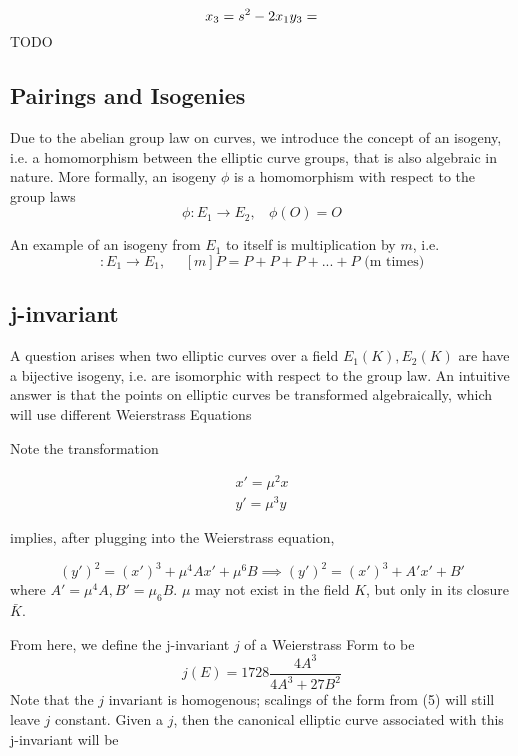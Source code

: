 \documentclass[12pt,twoside]{article}
\begin{document}
\begin{equation}
x_{3} = s^{2} - 2x_{1} \\
y_{3} = 
\end{equation} 
TODO




\subsection{Pairings and Isogenies} 
Due to the abelian group law on curves, we introduce the concept of an isogeny, i.e. a homomorphism between the elliptic curve groups, that is also algebraic in nature. More formally, an isogeny $\phi$ is a homomorphism with respect to the group laws
$$ \phi: E_{1} \rightarrow E_{2}, \> \> \> \> \phi(O) = O $$

An example of an isogeny from $E_{1}$ to itself is multiplication by $m$, i.e. 
\begin{equation} 
[m]: E_{1} \rightarrow E_{1}, \> \> \> \> \> \> [m]P = P+P+P+...+P \textrm{  (m times)}
\end{equation}
\subsection{j-invariant} 
A question arises when two elliptic curves over a field $E_{1}(K), E_{2}(K)$ are have a bijective isogeny, i.e. are isomorphic with respect to the group law. 
An intuitive answer is that the points on elliptic curves be transformed algebraically, which will use different Weierstrass Equations

Note the transformation  

\begin{align*}
x' = \mu^{2}x \\   
y' = \mu^{3}y 
\end{align*}

implies, after plugging into the Weierstrass equation,

\begin{equation} 
(y')^{2} = (x')^{3} + \mu^{4}Ax' +\mu^{6}B \implies (y')^{2} = (x')^{3} + A'x' + B'  
\end{equation} 
where $A' = \mu^{4}A, B' = \mu_{6}B$. $\mu$ may not exist in the field $K$, but only in its closure $\bar{K}$. 

From here, we define the j-invariant $j$ of a Weierstrass Form to be 
\begin{equation} 
j(E) = 1728 \frac{4A^{3}}{4A^{3} + 27B^{2}}
\end{equation}
Note that the $j$ invariant is homogenous; scalings of the form from (5) will still leave $j$ constant. Given a $j$, then the canonical elliptic curve associated with this j-invariant will be 
\end{document}
